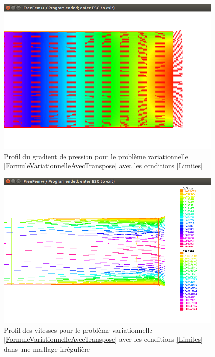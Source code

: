 \documentclass[11pt,a4paper]{article}
\numberwithin{equation}{subsection}
\numberwithin{figure}{subsection}
\begin{document}
\begin{figure}[h]
\centering
\includegraphics[scale=0.4]{StokesConditionsTransposePression.png}
\caption{Profil du gradient de pression pour le problème variationnelle \ref{FormuleVariationnelleAvecTranspose} avec les conditions \ref{Limites}}
\label{StokesLimitesTransposePression}
\end{figure}

\begin{figure}[h]
\centering
\includegraphics[scale=0.4]{StokesLimitesTransposeVitessesIrregulier.png}
\caption{Profil des vitesses pour le problème variationnelle \ref{FormuleVariationnelleAvecTranspose} avec les conditions \ref{Limites} dans une maillage irrégulière}
\label{StokesLimitesTransposeVitessesIrregulier}
\end{figure}
\end{document}
